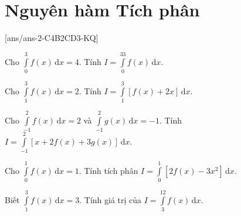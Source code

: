 \chapter{Nguyên hàm Tích phân}

[ans/ans-2-C4B2CD3-KQ]
\TNSA

\begin{ex}%
	Cho $\displaystyle\int\limits_0^3f(x)\mathrm{\,d}x=4$. Tính $I=\displaystyle\int\limits_0^33f(x)\mathrm{\,d}x$.\\
\end{ex}
\begin{ex}%
	Cho $\displaystyle\int\limits_1^3f(x)\mathrm{\,d}x=2$. Tính $I=\displaystyle\int\limits_1^3\left[f(x)+2x\right]\mathrm{\,d}x$.\\
	\end{ex}
	
	\begin{ex}%
Cho $\displaystyle\int\limits_{-1}^2f(x)\mathrm{\,d}x=2$ và $\displaystyle\int\limits_{-1}^2g(x)\mathrm{\,d}x=-1$. Tính $ I=\displaystyle\int\limits_{-1}^2\left[x+2f(x)+3g(x)\right]\mathrm{\,d}x$.\\
\end{ex}

\begin{ex}%
Cho $\displaystyle\int\limits_0^1f(x)\mathrm{\,d}x=1$. Tính tích phân $ I=\displaystyle\int\limits_0^1\left[2f(x)-3x^2\right]\mathrm{\,d}x.$\\
\end{ex}

\begin{ex}%
Biết $\displaystyle\int\limits_1^3f(x)\mathrm{\,d}x=3$. Tính giá trị của $ I=\displaystyle\int\limits_3^12f(x)\mathrm{\,d}x$.\\
\end{ex}

